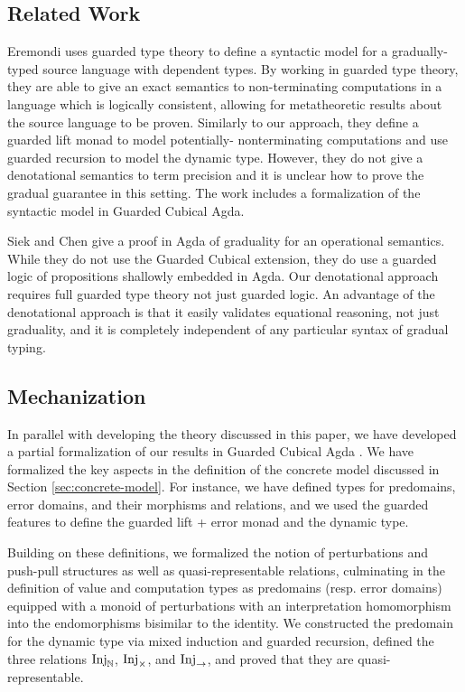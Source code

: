 \subsection{Related Work}
Eremondi \cite{Eremondi_2023} uses guarded type theory to
define a syntactic model for a gradually-typed source
language with dependent types. By working in guarded type theory, they are
able to give an exact semantics to non-terminating computations in a language
which is logically consistent, allowing for metatheoretic results about the
source language to be proven.
%
Similarly to our approach, they define a guarded lift monad to model potentially-
nonterminating computations and use guarded recursion to model the dynamic type.
However, they do not give a denotational semantics to term precision and it is unclear
how to prove the gradual guarantee in this setting.
The work includes a formalization of the syntactic model in Guarded Cubical Agda.

Siek and Chen \cite{siek-chen2021} give a proof in Agda of graduality
for an operational semantics. While they do not use the Guarded
Cubical extension, they do use a guarded logic of propositions
shallowly embedded in Agda. Our denotational approach requires full
guarded type theory not just guarded logic. An advantage of the
denotational approach is that it easily validates equational
reasoning, not just graduality, and it is completely independent of
any particular syntax of gradual typing.

\subsection{Mechanization}
In parallel with developing the theory discussed in this paper, we have
developed a partial formalization of our results in Guarded Cubical Agda
\cite{veltri-vezzosi2020}.
%
We have formalized the key aspects in the definition of the concrete model
discussed in Section \ref{sec:concrete-model}. For instance, we have defined
types for predomains, error domains, and their morphisms and relations, and we
used the guarded features to define the guarded lift + error monad and the
dynamic type.

Building on these definitions, we formalized the notion of perturbations and
push-pull structures as well as quasi-representable relations, culminating in
the definition of value and computation types as predomains (resp. error
domains) equipped with a monoid of perturbations with an interpretation
homomorphism into the endomorphisms bisimilar to the identity. We constructed
the predomain for the dynamic type via mixed induction and guarded recursion,
defined the three relations $\text{Inj}_\mathbb{N}$, $\text{Inj}_\times$, and $\text{Inj}_\to$, and proved that they are
quasi-representable.

